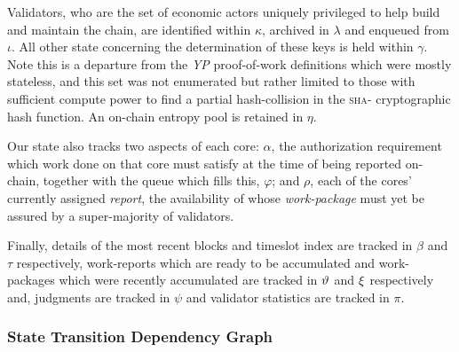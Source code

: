 Validators, who are the set of economic actors uniquely privileged to help build and maintain the \Jam chain, are identified within $\kappa$, archived in $\lambda$ and enqueued from $\iota$. All other state concerning the determination of these keys is held within $\gamma$. Note this is a departure from the \emph{YP} proof-of-work definitions which were mostly stateless, and this set was not enumerated but rather limited to those with sufficient compute power to find a partial hash-collision in the \textsc{sha}- cryptographic hash function. An on-chain entropy pool is retained in $\eta$.

Our state also tracks two aspects of each core: $\alpha$, the authorization requirement which work done on that core must satisfy at the time of being reported on-chain, together with the queue which fills this, $\varphi$; and $\rho$, each of the cores' currently assigned \emph{report}, the availability of whose \emph{work-package} must yet be assured by a super-majority of validators.

Finally, details of the most recent blocks and timeslot index are tracked in $\beta$ and $\tau$ respectively, work-reports which are ready to be accumulated and work-packages which were recently accumulated are tracked in $\vartheta$ and $\xi$ respectively and, judgments are tracked in $\psi$ and validator statistics are tracked in $\pi$.

\subsubsection{State Transition Dependency Graph}


